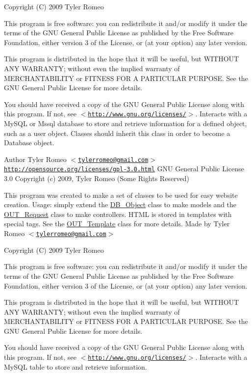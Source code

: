 Copyright (C) 2009 Tyler Romeo

This program is free software: you can redistribute it and/or modify it under the terms of the GNU General Public License as published by the Free Software Foundation, either version 3 of the License, or (at your option) any later version.

This program is distributed in the hope that it will be useful, but WITHOUT ANY WARRANTY; without even the implied warranty of MERCHANTABILITY or FITNESS FOR A PARTICULAR PURPOSE. See the GNU General Public License for more details.

You should have received a copy of the GNU General Public License along with this program. If not, see $<$\href{http://www.gnu.org/licenses/}{\tt http://www.gnu.org/licenses/}$>$. Interacts with a MySQL or Mssql database to store and retrieve information for a defined object, such as a user object. Classes should inherit this class in order to become a Database object.

\begin{DoxyAuthor}{Author}
Tyler Romeo $<$\href{mailto:tylerromeo@gmail.com}{\tt tylerromeo@gmail.com}$>$  \href{http://opensource.org/licenses/gpl-3.0.html}{\tt http://opensource.org/licenses/gpl-\/3.0.html} GNU General Public License 3.0  Copyright (c) 2009, Tyler Romeo (Some Rights Reserved)
\end{DoxyAuthor}
This program was created to make a set of classes to be used for easy website creation. Usage: simply extend the \hyperlink{classDB__Object}{DB\_\-Object} class to make models and the \hyperlink{classOUT__Request}{OUT\_\-Request} class to make controllers. HTML is stored in templates with special tags. See the \hyperlink{classOUT__Template}{OUT\_\-Template} class for more details. Made by Tyler Romeo $<$\href{mailto:tylerromeo@gmail.com}{\tt tylerromeo@gmail.com}$>$

Copyright (C) 2009 Tyler Romeo

This program is free software: you can redistribute it and/or modify it under the terms of the GNU General Public License as published by the Free Software Foundation, either version 3 of the License, or (at your option) any later version.

This program is distributed in the hope that it will be useful, but WITHOUT ANY WARRANTY; without even the implied warranty of MERCHANTABILITY or FITNESS FOR A PARTICULAR PURPOSE. See the GNU General Public License for more details.

You should have received a copy of the GNU General Public License along with this program. If not, see $<$\href{http://www.gnu.org/licenses/}{\tt http://www.gnu.org/licenses/}$>$. Interacts with a MySQL table to store and retrieve information.

